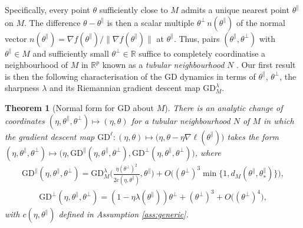 \documentclass{article}
\newcommand{\RB}{\mathbb{R}}
\newcommand{\tpa}{\theta^{\parallel}}
\newcommand{\tpe}{\theta^{\perp}}
\newcommand{\GD}{\mathrm{GD}}
\theoremstyle{plain}
\newtheorem{theorem}{Theorem}[section]
\theoremstyle{definition}
\theoremstyle{remark}
\begin{document}
Specifically, every point $\theta$ sufficiently close to $M$ admits a unique nearest point $\tpa$ on $M$. The difference $\theta-\tpa$ is then a scalar multiple $\tpe\,n(\tpa)$ of the normal vector $n(\tpa) = \nabla f(\tpa)/\|\nabla f(\tpa)\|$ at $\tpa$. Thus, pairs $(\tpa,\tpe)$ with $\tpa\in M$ and sufficiently small $\tpe\in\RB$ suffice to completely coordinatise a neighbourhood of $M$ in $\RB^p$ known as a \emph{tubular neighbourhood} $N$ \cite[p. 147]{leesmooth}. Our first result is then the following characterisation of the GD dynamics in terms of $\theta^{\parallel}$, $\theta^{\perp}$, the sharpness $\lambda$ and its Riemannian gradient descent map $\GD^{\lambda}_M$.


\begin{theorem}[Normal form for GD about $M$]\label{thm:approximatedynamics}
    There is an analytic change of coordinates $(\eta,\tpa,\tpe)\mapsto (\eta,\theta)$ for a tubular neighbourhood $N$ of $M$ in which the gradient descent map $\GD^{\ell}:(\eta, \theta) \mapsto \big(\eta,\theta-\eta\nabla\ell(\tpa)\big)$ takes the form $(\eta,\tpa,\tpe)\mapsto \big(\eta,\GD^{\parallel}(\eta,\tpa,\tpe),\GD^{\perp}(\eta,\tpa,\tpe)\big)$, where
    \begin{align}
        \GD^{\parallel}(\eta,\tpa,\tpe) = \GD^{\lambda}_M\bigg(\frac{\eta(\tpe)^2}{2c(\eta,\tpa)},\tpa\bigg) + O\big((\tpe)^3\min\{1,d_M(\tpa,\tpa_*)\}\big),\label{eq:thetaparallel}
    \end{align}
    \begin{align}
        \GD^{\perp}(\eta,\tpa,\tpe) = (1-\eta\lambda(\tpa))\tpe + (\tpe)^3 + O\big((\tpe)^4\big),\label{eq:thetaperp}
    \end{align}
    with $c(\eta,\tpa)$ defined in Assumption \ref{ass:generic}.
\end{theorem}
\end{document}
